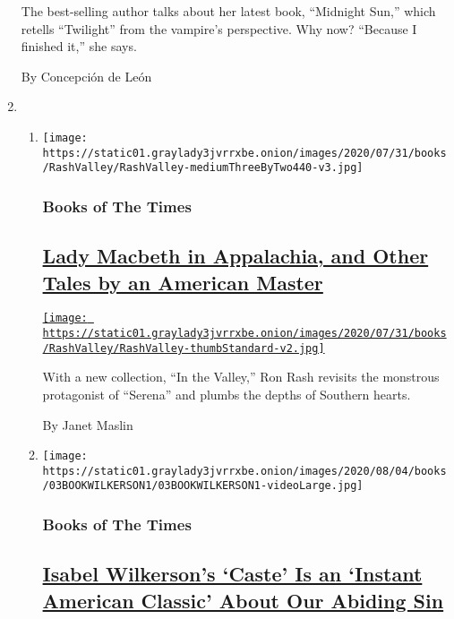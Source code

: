 \begin{enumerate}
  The best-selling author talks about her latest book, ``Midnight Sun,''
  which retells ``Twilight'' from the vampire's perspective. Why now?
  ``Because I finished it,'' she says.

  By Concepción de León
\item
  \begin{enumerate}
  \def\labelenumii{\arabic{enumii}.}
  \item
    \texttt{[image: https://static01.graylady3jvrrxbe.onion/images/2020/07/31/books/RashValley/RashValley-mediumThreeByTwo440-v3.jpg]}

    \hypertarget{books-of-the-times-1}{%
    \subsubsection{Books of The Times}\label{books-of-the-times-1}}

    \hypertarget{lady-macbeth-in-appalachia-and-other-tales-by-an-american-master}{%
    \subsection{\texorpdfstring{\href{/2020/08/02/books/ron-rash-in-valley-serena.html}{Lady
    Macbeth in Appalachia, and Other Tales by an American
    Master}}{Lady Macbeth in Appalachia, and Other Tales by an American Master}}\label{lady-macbeth-in-appalachia-and-other-tales-by-an-american-master}}

    \href{/2020/08/02/books/ron-rash-in-valley-serena.html}{\texttt{[image: https://static01.graylady3jvrrxbe.onion/images/2020/07/31/books/RashValley/RashValley-thumbStandard-v2.jpg]}}

    With a new collection, ``In the Valley,'' Ron Rash revisits the
    monstrous protagonist of ``Serena'' and plumbs the depths of
    Southern hearts.

    By Janet Maslin
  \item
    \texttt{[image: https://static01.graylady3jvrrxbe.onion/images/2020/08/04/books/03BOOKWILKERSON1/03BOOKWILKERSON1-videoLarge.jpg]}

    \hypertarget{books-of-the-times-2}{%
    \subsubsection{Books of The Times}\label{books-of-the-times-2}}

    \hypertarget{isabel-wilkersons-caste-is-an-instant-american-classic-about-our-abiding-sin}{%
    \subsection{\texorpdfstring{\href{/2020/07/31/books/review-caste-isabel-wilkerson-origins-of-our-discontents.html}{Isabel
    Wilkerson's `Caste' Is an `Instant American Classic' About Our
    Abiding
    Sin}}{Isabel Wilkerson's `Caste' Is an `Instant American Classic' About Our Abiding Sin}}\label{isabel-wilkersons-caste-is-an-instant-american-classic-about-our-abiding-sin}}


\end{enumerate}
\end{enumerate}
